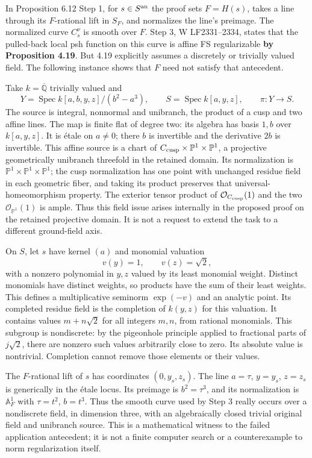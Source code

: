 \documentclass[
  11pt,
]{article}
\begin{document}
In Proposition 6.12 Step 1, for \(s\in S^{\rm an}\) the proof sets
\(F=H(s)\), takes a line through its \(F\)-rational lift in \(S_F\), and
normalizes the line's preimage. The normalized curve \(C_s^\nu\) is
smooth over \(F\). Step 3, W LF2331--2334, states that the pulled-back
local psh function on this curve is affine FS regularizable \textbf{by
Proposition 4.19}. But 4.19 explicitly assumes a discretely or trivially
valued field. The following instance shows that \(F\) need not satisfy
that antecedent.

Take \(k=\overline{\mathbb Q}\) trivially valued and \[
 Y=\operatorname{Spec} k[a,b,y,z]/(b^2-a^3),\qquad
 S=\operatorname{Spec} k[a,y,z],\qquad \pi:Y\longrightarrow S.
 \tag{15}
\] The source is integral, nonnormal and unibranch, the product of a
cusp and two affine lines. The map is finite flat of degree two: its
algebra has basis \(1,b\) over \(k[a,y,z]\). It is étale on \(a\ne0\);
there \(b\) is invertible and the derivative \(2b\) is invertible. This
affine source is a chart of
\(C_{\rm cusp}\times\mathbb P^1\times\mathbb P^1\), a projective
geometrically unibranch threefold in the retained domain. Its
normalization is \(\mathbb P^1\times\mathbb P^1\times\mathbb P^1\); the
cusp normalization has one point with unchanged residue field in each
geometric fiber, and taking its product preserves that
universal-homeomorphism property. The exterior tensor product of
\(\mathcal O_{C_{\rm cusp}}(1)\) and the two
\(\mathcal O_{\mathbb P^1}(1)\) is ample. Thus this field issue arises
internally in the proposed proof on the retained projective domain. It
is not a request to extend the task to a different ground-field axis.

On \(S\), let \(s\) have kernel \((a)\) and monomial valuation
\[v(y)=1,\qquad v(z)=\sqrt2,\] with a nonzero polynomial in \(y,z\)
valued by its least monomial weight. Distinct monomials have distinct
weights, so products have the sum of their least weights. This defines a
multiplicative seminorm \(\exp(-v)\) and an analytic point. Its
completed residue field is the completion of \(k(y,z)\) for this
valuation. It contains values \(m+n\sqrt2\) for all integers \(m,n\),
from rational monomials. This subgroup is nondiscrete: by the pigeonhole
principle applied to fractional parts of \(j\sqrt2\), there are nonzero
such values arbitrarily close to zero. Its absolute value is nontrivial.
Completion cannot remove those elements or their values.

The \(F\)-rational lift of \(s\) has coordinates \((0,y_s,z_s)\). The
line \(a=\tau\), \(y=y_s\), \(z=z_s\) is generically in the étale locus.
Its preimage is \(b^2=\tau^3\), and its normalization is
\(\mathbb A^1_F\) with \(\tau=t^2\), \(b=t^3\). Thus the smooth curve
used by Step 3 really occurs over a nondiscrete field, in dimension
three, with an algebraically closed trivial original field and unibranch
source. This is a mathematical witness to the failed application
antecedent; it is not a finite computer search or a counterexample to
norm regularization itself.
\end{document}
